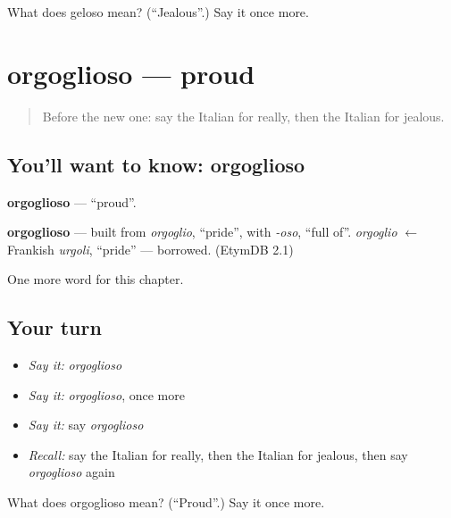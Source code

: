 \begin{tcolorbox}[breakable,colback=teal!4,colframe=teal!35!black,title={Before you move on}]
What does geloso mean? (\textquotedblleft{}Jealous\textquotedblright{}.) Say it once more.
\end{tcolorbox}
\section[orgoglioso]{orgoglioso — proud}

\label{lesson:IT-C218-orgoglioso}



\begin{quote}
Before the new one: say the Italian for really, then the Italian for jealous.
\end{quote}

\subsection*{You'll want to know: orgoglioso}
\textbf{orgoglioso} — \textquotedblleft{}proud\textquotedblright{}.

\begin{cousinweb}
\textbf{orgoglioso} — built from \emph{orgoglio}, \textquotedblleft{}pride\textquotedblright{}, with \emph{-oso}, \textquotedblleft{}full of\textquotedblright{}. \emph{orgoglio} $\leftarrow$ Frankish \emph{urgoli}, \textquotedblleft{}pride\textquotedblright{} — borrowed. (EtymDB 2.1)
\end{cousinweb}

\begin{grammarlens}[title={What you've built}]
One more word for this chapter.
\end{grammarlens}

\subsection*{Your turn}
\begin{itemize}
\raggedright
  \item \emph{Say it:} \emph{orgoglioso}
  \item \emph{Say it:} \emph{orgoglioso}, once more
  \item \emph{Say it:} say \emph{orgoglioso}
  \item \emph{Recall:} say the Italian for really, then the Italian for jealous, then say \emph{orgoglioso} again
\end{itemize}

\begin{tcolorbox}[breakable,colback=teal!4,colframe=teal!35!black,title={Before you move on}]
What does orgoglioso mean? (\textquotedblleft{}Proud\textquotedblright{}.) Say it once more.
\end{tcolorbox}
